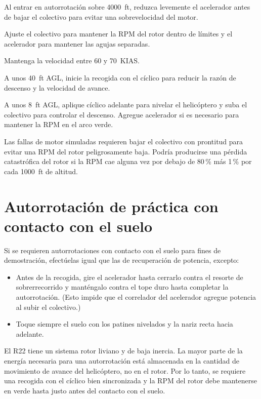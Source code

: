 \begin{nota}
Al entrar en autorrotación sobre 4000~ft, reduzca levemente el acelerador antes de bajar el colectivo para evitar una sobrevelocidad del motor.
\end{nota}

\begin{pasos}
\setcounter{enumi}{2}
\item Ajuste el colectivo para mantener la RPM del rotor dentro de límites y el acelerador para mantener las agujas separadas.
\item Mantenga la velocidad entre 60 y 70~KIAS.
\item A unos 40~ft AGL, inicie la recogida con el cíclico para reducir la razón de descenso y la velocidad de avance.
\item A unos 8~ft AGL, aplique cíclico adelante para nivelar el helicóptero y suba el colectivo para controlar el descenso. Agregue acelerador si es necesario para mantener la RPM en el arco verde.
\end{pasos}

\begin{precaucion}
Las fallas de motor simuladas requieren bajar el colectivo con prontitud para evitar una RPM del rotor peligrosamente baja. Podría producirse una pérdida catastrófica del rotor si la RPM cae alguna vez por debajo de 80\,\% más 1\,\% por cada 1000~ft de altitud.
\end{precaucion}

\section{Autorrotación de práctica con contacto con el suelo}

Si se requieren autorrotaciones con contacto con el suelo para fines de demostración, efectúelas igual que las de recuperación de potencia, excepto:

\begin{itemize}
\item Antes de la recogida, gire el acelerador hasta cerrarlo contra el resorte de sobrerrecorrido y manténgalo contra el tope duro hasta completar la autorrotación. (Esto impide que el correlador del acelerador agregue potencia al subir el colectivo.)
\item Toque siempre el suelo con los patines nivelados y la nariz recta hacia adelante.
\end{itemize}

\begin{precaucion}
El R22 tiene un sistema rotor liviano y de baja inercia. La mayor parte de la energía necesaria para una autorrotación está almacenada en la cantidad de movimiento de avance del helicóptero, no en el rotor. Por lo tanto, se requiere una recogida con el cíclico bien sincronizada y la RPM del rotor debe mantenerse en verde hasta justo antes del contacto con el suelo.
\end{precaucion}

